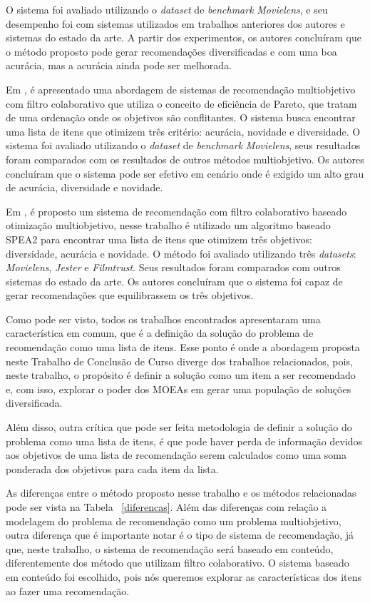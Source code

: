 O sistema foi avaliado utilizando o \textit{dataset} de \textit{benchmark}  \textit{Movielens}, e seu desempenho foi com sistemas utilizados em trabalhos anteriores dos autores e sistemas do estado da arte. A partir dos experimentos, os autores concluíram que o método proposto pode gerar recomendações diversificadas e com uma boa acurácia, mas a acurácia ainda pode ser melhorada.

Em  \cite{ribeiro2015multiobjective}, é apresentado uma abordagem de sistemas de recomendação multiobjetivo com filtro colaborativo que utiliza o conceito de eficiência de Pareto, que tratam de uma ordenação onde os objetivos são conflitantes. O sistema busca encontrar uma lista de itens que otimizem três critério: acurácia, novidade e diversidade. O sistema foi avaliado utilizando o \textit{dataset} de \textit{benchmark}  \textit{Movielens}, seus resultados foram comparados com os resultados de outros métodos multiobjetivo. Os autores concluíram que o sistema pode ser efetivo em cenário onde é exigido um alto grau de acurácia, diversidade e novidade.

Em \cite{oliveira2018multi}, é proposto um sistema de recomendação com filtro colaborativo baseado otimização multiobjetivo, nesse trabalho é utilizado um algoritmo baseado SPEA2 para encontrar uma lista de itens que otimizem  três objetivos: diversidade, acurácia e novidade. O método foi avaliado utilizando três \textit{datasets}:  \textit{Movielens}, \textit{Jester} e \textit{Filmtrust}. Seus resultados foram comparados com outros sistemas do estado da arte. Os autores concluíram que o sistema foi capaz de gerar recomendações que equilibrassem os três objetivos.

Como pode ser visto, todos os trabalhos encontrados apresentaram uma característica em comum, que é a definição da solução do problema de recomendação como uma lista de itens. Esse ponto é  onde a abordagem proposta neste Trabalho de Conclusão de Curso diverge dos trabalhos relacionados, pois, neste trabalho, o propósito é definir a solução como um item a ser recomendado e, com isso, explorar o poder dos MOEAs em gerar uma população de soluções diversificada.

Além disso, outra crítica que pode ser feita metodologia de definir a solução do problema como uma lista de itens, é que pode haver perda de informação devidos aos objetivos de uma  lista de recomendação serem calculados como uma soma ponderada dos objetivos para cada item da lista.

As diferenças entre o método proposto nesse trabalho e os métodos relacionadas pode ser vista na Tabela ~\ref{diferencas}. Além das diferenças com relação a modelagem do problema de recomendação como um problema multiobjetivo, outra diferença que é importante notar é o tipo  de sistema de recomendação, já que, neste trabalho, o sistema de recomendação será baseado em conteúdo, diferentemente dos método que utilizam filtro colaborativo. O sistema baseado em conteúdo foi escolhido, pois nós queremos explorar as características dos itens ao fazer uma recomendação.

